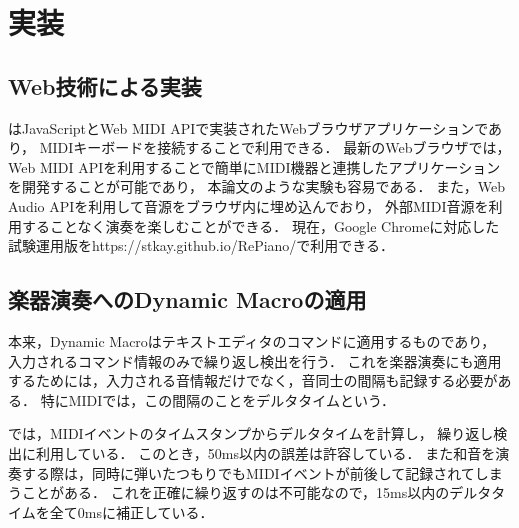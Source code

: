 \section{実装}

\subsection{Web技術による実装}

{\system}はJavaScriptとWeb MIDI API\cite{webmidi}で実装されたWebブラウザアプリケーションであり，
MIDIキーボードを接続することで利用できる．
最新のWebブラウザでは，
Web MIDI APIを利用することで簡単にMIDI機器と連携したアプリケーションを開発することが可能であり，
本論文のような実験も容易である．
また，Web Audio API\cite{webaudio}を利用して音源をブラウザ内に埋め込んでおり，
外部MIDI音源を利用することなく演奏を楽しむことができる．
現在，Google Chromeに対応した試験運用版をhttps://stkay.github.io/RePiano/で利用できる．

\subsection{楽器演奏へのDynamic Macroの適用}
本来，Dynamic Macroはテキストエディタのコマンドに適用するものであり，
入力されるコマンド情報のみで繰り返し検出を行う．
これを楽器演奏にも適用するためには，入力される音情報だけでなく，音同士の間隔も記録する必要がある．
特にMIDIでは，この間隔のことをデルタタイムという．

{\system}では，MIDIイベントのタイムスタンプからデルタタイムを計算し，
繰り返し検出に利用している．
このとき，50ms以内の誤差は許容している．
また和音を演奏する際は，同時に弾いたつもりでもMIDIイベントが前後して記録されてしまうことがある．
これを正確に繰り返すのは不可能なので，15ms以内のデルタタイムを全て0msに補正している．



